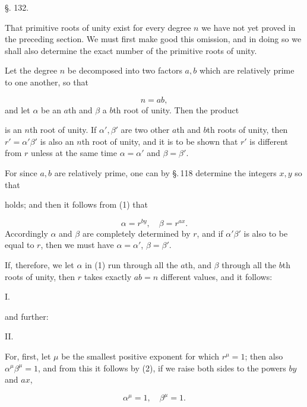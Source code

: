 \begin{center}
§. 132.

\end{center}

That primitive roots of unity exist for every degree $n$ we have not yet proved in the
preceding section. We must first make good this omission, and in doing so we shall also
determine the exact number of the primitive roots of unity.

Let the degree $n$ be decomposed into two factors $a, b$ which are relatively prime to one
another, so that

\[
n = ab,
\]
and let $\alpha$ be an $a$th and $\beta$ a $b$th root of unity. Then the product

is an $n$th root of unity. If $\alpha', \beta'$ are two other $a$th and $b$th roots of
unity, then $r' = \alpha'\beta'$ is also an $n$th root of unity, and it is to be shown
that $r'$ is different from $r$ unless at the same time $\alpha = \alpha'$ and
$\beta = \beta'$.

For since $a, b$ are relatively prime, one can by \S.\,118 determine the integers $x, y$
so that

holds; and then it follows from (1) that

\[
\alpha = r^{by}, \quad \beta = r^{ax}.
\]
Accordingly $\alpha$ and $\beta$ are completely determined by $r$, and if $\alpha'\beta'$
is also to be equal to $r$, then we must have $\alpha = \alpha'$, $\beta = \beta'$.

If, therefore, we let $\alpha$ in (1) run through all the $a$th, and $\beta$ through all
the $b$th roots of unity, then $r$ takes exactly $ab = n$ different values, and it
follows:

I.~

and further:

II.~

For, first, let $\mu$ be the smallest positive exponent for which $r^\mu = 1$; then also
$\alpha^\mu \beta^\mu = 1$, and from this it follows by (2), if we raise both sides to the
powers $by$ and $ax$,

\[
\alpha^\mu = 1, \quad \beta^\mu = 1.
\]
